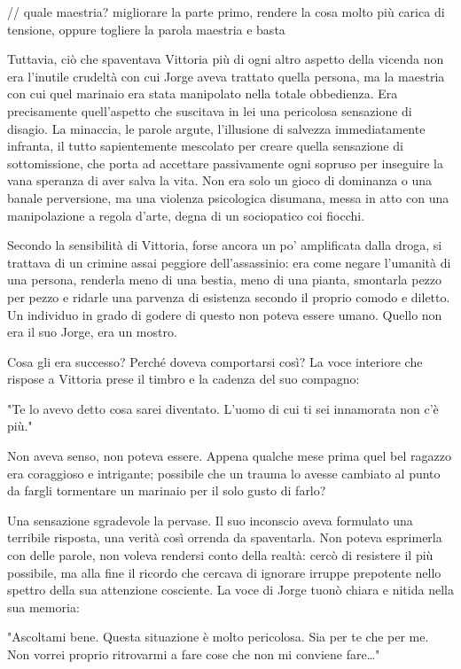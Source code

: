 // quale maestria? migliorare la parte primo, rendere la cosa molto più carica di tensione, oppure togliere la parola maestria e basta

Tuttavia, ciò che spaventava Vittoria più di ogni altro aspetto della vicenda non era l'inutile crudeltà con cui Jorge aveva trattato quella persona, ma la maestria con cui quel marinaio era stata manipolato nella totale obbedienza. Era precisamente quell'aspetto che suscitava in lei una pericolosa sensazione di disagio. La minaccia, le parole argute, l'illusione di salvezza immediatamente infranta, il tutto sapientemente mescolato per creare quella sensazione di sottomissione, che porta ad accettare passivamente ogni sopruso per inseguire la vana speranza di aver salva la vita. Non era solo un gioco di dominanza o una banale perversione, ma una violenza psicologica disumana, messa in atto con una manipolazione a regola d'arte, degna di un sociopatico coi fiocchi.

Secondo la sensibilità di Vittoria, forse ancora un po' amplificata dalla droga, si trattava di un crimine assai peggiore dell'assassinio: era come negare l'umanità di una persona, renderla meno di una bestia, meno di una pianta, smontarla pezzo per pezzo e ridarle una parvenza di esistenza secondo il proprio comodo e diletto. Un individuo in grado di godere di questo non poteva essere umano. Quello non era il suo Jorge, era un mostro.

Cosa gli era successo? Perché doveva comportarsi così? La voce interiore che rispose a Vittoria prese il timbro e la cadenza del suo compagno:

"Te lo avevo detto cosa sarei diventato. L'uomo di cui ti sei innamorata non c'è più."

Non aveva senso, non poteva essere. Appena qualche mese prima quel bel ragazzo era coraggioso e intrigante; possibile che un trauma lo avesse cambiato al punto da fargli tormentare un marinaio per il solo gusto di farlo?

Una sensazione sgradevole la pervase. Il suo inconscio aveva formulato una terribile risposta, una verità così orrenda da spaventarla. Non poteva esprimerla con delle parole, non voleva rendersi conto della realtà: cercò di resistere il più possibile, ma alla fine il ricordo che cercava di ignorare irruppe prepotente nello spettro della sua attenzione cosciente. La voce di Jorge tuonò chiara e nitida nella sua memoria:

"Ascoltami bene. Questa situazione è molto pericolosa. Sia per te che per me. Non vorrei proprio ritrovarmi a fare cose che non mi conviene fare\ldots"

